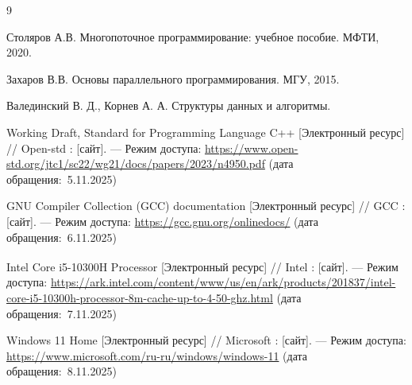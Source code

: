 \begin{thebibliography}{9}
	
	Столяров А.В.
	Многопоточное программирование: учебное пособие.
	МФТИ, 2020.
	
	Захаров В.В.
	Основы параллельного программирования.
	МГУ, 2015.
	
	Валединский В. Д., Корнев А. А. 
	Структуры данных и алгоритмы.
	
	Working Draft, Standard for Programming Language C++ [Электронный ресурс] // Open-std : [сайт]. --- Режим доступа: \url{https://www.open-std.org/jtc1/sc22/wg21/docs/papers/2023/n4950.pdf} (дата обращения:~5.11.2025)
	
	GNU Compiler Collection (GCC) documentation [Электронный ресурс] // GCC : [сайт]. --- Режим доступа: \url{https://gcc.gnu.org/onlinedocs/} (дата обращения:~6.11.2025)
	
	Intel\textsuperscript{\textregistered} Core\texttrademark{} i5-10300H Processor [Электронный ресурс] // Intel : [сайт]. --- Режим доступа: \url{https://ark.intel.com/content/www/us/en/ark/products/201837/intel-core-i5-10300h-processor-8m-cache-up-to-4-50-ghz.html} (дата обращения:~7.11.2025)
	
	Windows 11 Home [Электронный ресурс] // Microsoft : [сайт]. --- Режим доступа: \url{https://www.microsoft.com/ru-ru/windows/windows-11} (дата обращения:~8.11.2025)

\end{thebibliography}
